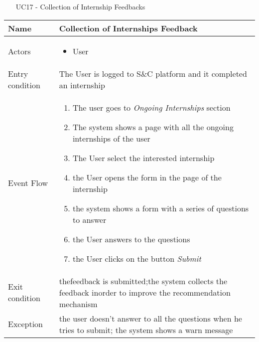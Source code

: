 						\begin{table} [H]
					\centering
					\begin{itemize}
						\item [UC17] - Collection of Internship Feedbacks
					\end{itemize}
					
					\begin{tabular}{|| P{7.5cm} | P{7.5cm} ||}
						\hline
						Name & Collection of Internships Feedback \\
						\hline
						Actors & \parbox{5cm}{\begin{itemize}
								\item User
							\end{itemize}
						} \\
						\hline
						Entry condition & The User is logged to S\&C platform and it completed an internship \\
						\hline
						Event Flow & \parbox{5cm}{\begin{enumerate}[label=\alpha]
								\item The user goes to \textit{Ongoing Internships} section
								\item The system shows a page with 
								all the ongoing internships of the user 
								\item The User select the interested 
								internship  
								\item the User opens the form in the page of the internship
								\item the system shows a form with a series of questions to answer 
								\item the User answers to the questions
								\item the User clicks on the button \textit{Submit}
						\end{enumerate}} \\
						\hline 
						Exit condition & thefeedback is submitted;the system collects the
						feedback inorder to improve the recommendation
						mechanism \\
						\hline
						Exception & the user doesn't answer to all the questions when he tries to submit; the system shows a warn message \\
						\hline
					\end{tabular}
				\end{table}
				
